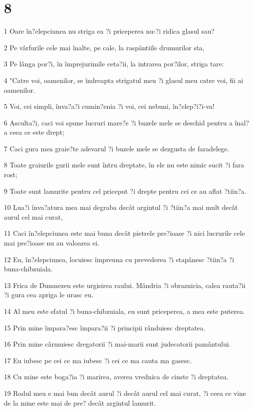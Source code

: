 \chapter{8}

\par 1 Oare în?elepciunea nu striga ea ?i priceperea nu-?i ridica glasul sau?
\par 2 Pe vârfurile cele mai înalte, pe cale, la raspântiile drumurilor sta,
\par 3 Pe lânga por?i, în împrejurimile ceta?ii, la intrarea por?ilor, striga tare:
\par 4 "Catre voi, oamenilor, se îndreapta strigatul meu ?i glasul meu catre voi, fii ai oamenilor.
\par 5 Voi, cei simpli, înva?a?i cumin?enia ?i voi, cei nebuni, în?elep?i?i-va!
\par 6 Asculta?i, caci voi spune lucruri mare?e ?i buzele mele se deschid pentru a înal?a ceea ce este drept;
\par 7 Caci gura mea graie?te adevarul ?i buzele mele se dezgusta de faradelege.
\par 8 Toate graiurile gurii mele sunt întru dreptate, în ele nu este nimic sucit ?i fara rost;
\par 9 Toate sunt lamurite pentru cel priceput ?i drepte pentru cei ce au aflat ?tiin?a.
\par 10 Lua?i înva?atura mea mai degraba decât argintul ?i ?tiin?a mai mult decât aurul cel mai curat,
\par 11 Caci în?elepciunea este mai buna decât pietrele pre?ioase ?i nici lucrurile cele mai pre?ioase nu au valoarea ei.
\par 12 Eu, în?elepciunea, locuiesc împreuna cu prevederea ?i stapânesc ?tiin?a ?i buna-chibzuiala.
\par 13 Frica de Dumnezeu este urgisirea raului. Mândria ?i obraznicia, calea rauta?ii ?i gura cea apriga le urasc eu.
\par 14 Al meu este sfatul ?i buna-chibzuiala, eu sunt priceperea, a mea este puterea.
\par 15 Prin mine împara?esc împara?ii ?i principii rânduiesc dreptatea.
\par 16 Prin mine cârmuiesc dregatorii ?i mai-marii sunt judecatorii pamântului.
\par 17 Eu iubesc pe cei ce ma iubesc ?i cei ce ma cauta ma gasesc.
\par 18 Cu mine este boga?ia ?i marirea, averea vrednica de cinste ?i dreptatea.
\par 19 Rodul meu e mai bun decât aurul ?i decât aurul cel mai curat, ?i ceea ce vine de la mine este mai de pre? decât argintul lamurit.
